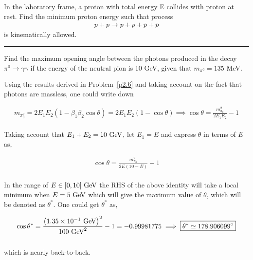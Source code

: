
\begin{problem}{2.8}
    In the laboratory frame, a proton with total energy E collides with proton at rest. Find the minimum proton energy such that process
    \begin{align*}
        p+p \to p+p+\bar{p}+\bar{p}
    \end{align*}
    is kinematically allowed.
\end{problem}
\begin{solution}
        
\end{solution} 

\noindent\rule{7in}{1.5pt}


\begin{problem}{2.9}
Find the maximum opening angle between the photons produced in the decay $\pi^0\to\gamma\gamma$ if the energy of the neutral pion is 10 GeV, given that $m_{\pi^0}=135$ MeV.
\end{problem}
\begin{solution}
Using the results derived in Problem~\ref{p2.6} and taking account on the fact that photons are massless, one could write down 

\begin{align*}
    m_{\pi_0^2} = 2E_1E_2 \left( 1- \beta_1 \beta_2 \cos \theta \right) = 2E_1E_2 \left( 1- \cos\theta \right) \implies \cos \theta =  \frac{m_{\pi_0}^2}{2E_1E_2} - 1  
\end{align*}\\
Taking account that $E_1+E_2 = 10 \text{ GeV}$, let $E_1=E$ and express $\theta$ in terms of $E$ as,

\begin{align*}
    \cos \theta =  \frac{m_{\pi_0}^2}{2E(10-E)} - 1  
\end{align*}\\
In the range of $E\in[0,10]\text{ GeV}$ the RHS of the above identity will take a local minimum when $E=5\text{ GeV}$ which will give the maximum value of $\theta$, which will be denoted as $\theta^\ast$. One could get $\theta^\ast$ as,

\begin{align*}
    \cos \theta^\ast = \frac{\left( \num{1.35e-1}\text{ GeV} \right)^2}{100 \text{ GeV}^2} - 1 = -0.99981775 \implies \boxed{\theta^\ast \simeq  178.906099^\circ}
\end{align*}\\
which is nearly back-to-back.
\end{solution} 

